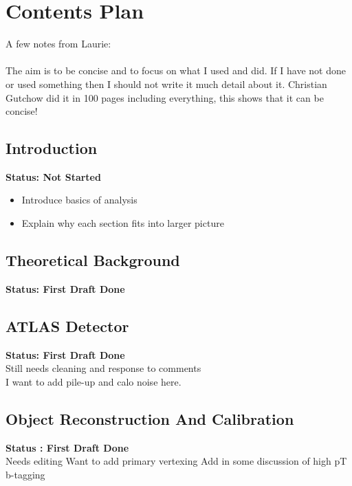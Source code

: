 %
%
%
\chapter{Contents Plan}

\noindent
A few notes from Laurie:\\
\indent\\
The aim is to be concise and to focus on what I used and did.
If I have not done or used something then I should not write it much detail about it.
Christian Gutchow did it in 100 pages including everything, this shows that it can be concise!

\section{Introduction}

\textbf{Status: Not Started}

\begin{itemize}
  \item{Introduce basics of analysis}
  \item{Explain why each section fits into larger picture}
\end{itemize}

\section{Theoretical Background}

\textbf{Status: First Draft Done}\\

\section{ATLAS Detector}

\textbf{Status: First Draft Done}\\
\noindent
Still needs cleaning and response to comments\\
I want to add pile-up and calo noise here.\\
\noindent

\section{Object Reconstruction And Calibration}

\textbf{Status : First Draft Done}\\
\noindent
Needs editing
Want to add primary vertexing
Add in some discussion of high pT b-tagging\\

